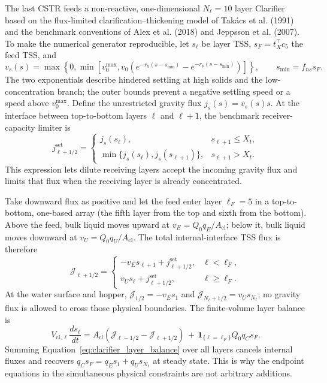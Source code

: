 \documentclass[a4paper,fleqn]{cas-sc}
\begin{document}
The last CSTR feeds a non-reactive, one-dimensional $N_\ell=10$ layer Clarifier based on the flux-limited clarification--thickening model of Tak\'acs et al. (1991) and the benchmark conventions of Alex et al. (2018) and Jeppsson et al. (2007). To make the numerical generator reproducible, let $s_\ell$ be layer TSS, $s_F=t_X^\top c_5$ the feed TSS, and
\begin{equation}
\label{eq:settling_velocity}
v_s(s)=\max\!\left\{0,\min\!\left[v_0^{\max},
v_0\left(e^{-r_h(s-s_{\min})}-e^{-r_p(s-s_{\min})}\right)\right]\right\},
\qquad s_{\min}=f_{ns}s_F.
\end{equation}
The two exponentials describe hindered settling at high solids and the low-concentration branch; the outer bounds prevent a negative settling speed or a speed above $v_0^{\max}$. Define the unrestricted gravity flux $j_s(s)=v_s(s)s$. At the interface between top-to-bottom layers $\ell$ and $\ell+1$, the benchmark receiver-capacity limiter is
\begin{equation}
\label{eq:clarifier_flux_limiter}
j^{\mathrm{set}}_{\ell+1/2}=
\begin{cases}
j_s(s_\ell), & s_{\ell+1}\leq X_t,\\
\min\{j_s(s_\ell),j_s(s_{\ell+1})\}, & s_{\ell+1}>X_t.
\end{cases}
\end{equation}
This expression lets dilute receiving layers accept the incoming gravity flux and limits that flux when the receiving layer is already concentrated.

Take downward flux as positive and let the feed enter layer $\ell_F=5$ in a top-to-bottom, one-based array (the fifth layer from the top and sixth from the bottom). Above the feed, bulk liquid moves upward at $v_E=Q_0q_E/A_{\mathrm{cl}}$; below it, bulk liquid moves downward at $v_U=Q_0q_U/A_{\mathrm{cl}}$. The total internal-interface TSS flux is therefore
\begin{equation}
\label{eq:clarifier_total_flux}
\mathcal J_{\ell+1/2}=
\begin{cases}
-v_Es_{\ell+1}+j^{\mathrm{set}}_{\ell+1/2}, & \ell<\ell_F,\\
v_Us_\ell+j^{\mathrm{set}}_{\ell+1/2}, & \ell\geq\ell_F.
\end{cases}
\end{equation}
At the water surface and hopper, $\mathcal J_{1/2}=-v_Es_1$ and $\mathcal J_{N_\ell+1/2}=v_Us_{N_\ell}$; no gravity flux is allowed to cross those physical boundaries. The finite-volume layer balance is
\begin{equation}
\label{eq:clarifier_layer_balance}
V_{\mathrm{cl},\ell}\frac{ds_\ell}{dt}
=A_{\mathrm{cl}}(\mathcal J_{\ell-1/2}-\mathcal J_{\ell+1/2})
\,+\,\mathbf1_{\{\ell=\ell_F\}}Q_0q_Cs_F.
\end{equation}
Summing Equation~\eqref{eq:clarifier_layer_balance} over all layers cancels internal fluxes and recovers $q_Cs_F=q_Es_1+q_Us_{N_\ell}$ at steady state. This is why the endpoint equations in the simultaneous physical constraints are not arbitrary additions.
\end{document}
